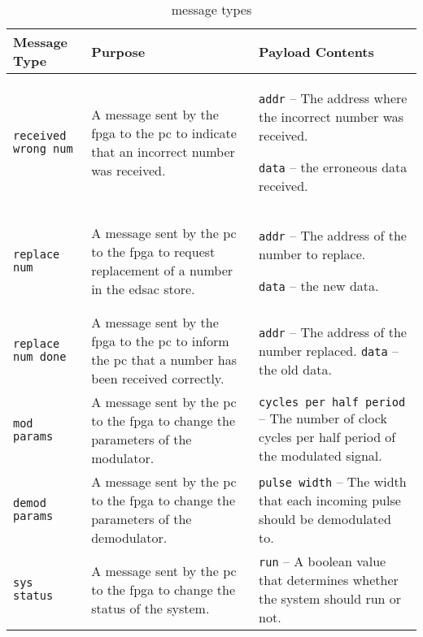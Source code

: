 \begin{longtable}{>{\raggedright}p{}  >{\raggedright}p{} >{\raggedright}p{} }
	
	\caption{ message types}\label{tbl:msg-types}\tabularnewline
	
	\toprule
	
	Message Type & Purpose & Payload Contents \tabularnewline
	
	\midrule
	
	\endhead %
	
	\bottomrule
	
	\endfoot
		
		\texttt{received wrong num} & A message sent by the \gls{fpga} to the \gls{pc} to indicate that an incorrect number was received. & \texttt{addr} -- The address where the incorrect number was received.
		
		\texttt{data} -- the erroneous data received. \tabularnewline
		


	\texttt{replace num} & A message sent by the \gls{pc} to the \gls{fpga} to request replacement of a number in the \gls{edsac} store. & \texttt{addr} -- The address of the number to replace.
	
	\texttt{data} -- the new data. \tabularnewline
	


		\texttt{replace num done} & A message sent by the \gls{fpga} to the \gls{pc} to inform the \gls{pc} that a number has been received correctly. & \texttt{addr} -- The address of the number replaced. \texttt{data} -- the old data. \tabularnewline
		
		


\texttt{mod params} & A message sent by the \gls{pc} to the \gls{fpga} to change the parameters of the modulator. & \texttt{cycles per half period} -- The number of clock cycles per half period of the modulated signal. \tabularnewline



\texttt{demod params} & A message sent by the \gls{pc} to the \gls{fpga} to change the parameters of the demodulator. & \texttt{pulse width} -- The width that each incoming pulse should be demodulated to. \tabularnewline


\texttt{sys status} & A message sent by the \gls{pc} to the \gls{fpga} to change the status of the system. & \texttt{run} -- A boolean value that determines whether the system should run or not. \tabularnewline



\end{longtable}

